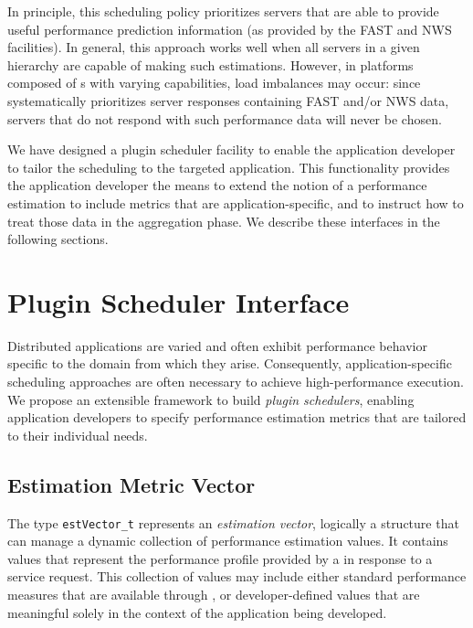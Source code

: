 In principle, this scheduling policy prioritizes servers that are able to
provide useful performance prediction information (as provided by the FAST and
NWS facilities). In general, this approach works well when all servers in a
given \diet hierarchy are capable of making such estimations. However, in
platforms composed of {\sed}s with varying capabilities, load imbalances may
occur: since \diet systematically prioritizes server responses containing FAST
and/or NWS data, servers that do not respond with such performance data will
never be chosen.

We have designed a plugin scheduler facility to enable the application
developer to tailor the \diet scheduling to the targeted application. This
functionality provides the application developer the means to extend the notion
of a performance estimation to include metrics that are application-specific,
and to instruct \diet how to treat those data in the aggregation phase.  We
describe these interfaces in the following sections.


\section{Plugin Scheduler Interface}

Distributed applications are varied and often exhibit performance behavior
specific to the domain from which they arise. Consequently,
application-specific scheduling approaches are often necessary to achieve
high-performance execution. We propose an extensible framework to build
\emph{plugin schedulers}, enabling application developers to specify
performance estimation metrics that are tailored to their individual needs.


\subsection{Estimation Metric Vector}\label{sect:estvector}

The type \texttt{estVector\_t} represents an \emph{estimation vector},
logically a structure that can manage a dynamic collection of performance
estimation values. It contains values that represent the performance profile
provided by a {\sed} in response to a \diet service request. This collection of
values may include either standard performance measures that are available
through \diet, or developer-defined values that are meaningful solely in the
context of the application being developed.

